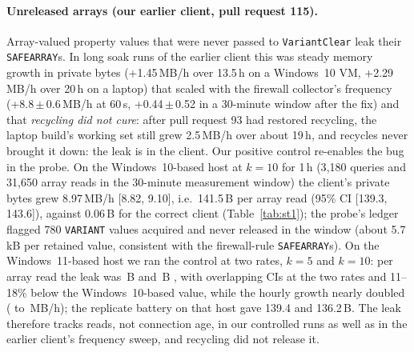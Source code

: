 \documentclass[letterpaper,twocolumn,10pt]{article}
\newcommand{\code}[1]{\texttt{\small #1}}
\begin{document}
\paragraph{Unreleased arrays (our earlier client, pull request 115).}
Array-valued property values that were never passed to \code{VariantClear} leak their \code{SAFEARRAY}s.
In long soak runs of the earlier client this was steady memory growth in private bytes (+1.45\,MB/h over 13.5\,h on a Windows~10 VM, +2.29\,MB/h over 20\,h on a laptop) that scaled with the firewall collector's frequency (+8.8\,$\pm$\,0.6\,MB/h at 60\,s, +0.44\,$\pm$\,0.52 in a 30-minute window after the fix) and that \emph{recycling did not cure}: after pull request 93 had restored recycling, the laptop build's working set still grew 2.5\,MB/h over about 19\,h, and recycles never brought it down: the leak is in the client.
Our positive control re-enables the bug in the probe.
On the Windows~10-based host at $k=10$ for 1\,h (3{,}180 queries and 31{,}650 array reads in the 30-minute measurement window) the client's private bytes grew 8.97\,MB/h [8.82, 9.10], i.e.\ 141.5\,B per array read (95\% CI [139.3, 143.6]), against 0.06\,B for the correct client (Table~\ref{tab:st1}); the probe's ledger flagged 780 \code{VARIANT} values acquired and never released in the window (about 5.7\,kB per retained value, consistent with the firewall-rule \code{SAFEARRAY}s).
On the Windows~11-based host we ran the control at two rates, $k=5$ and $k=10$: per array read the leak was \STtwoWbKfive{}\,B \STtwoWbKfiveCI{} and \STtwoWbKten{}\,B \STtwoWbKtenCI{}, with overlapping CIs at the two rates and 11--18\% below the Windows~10-based value, while the hourly growth nearly doubled (\STtwoWbRateFive{} to \STtwoWbRateTen{}\,MB/h); the replicate battery on that host gave 139.4 and 136.2\,B.
The leak therefore tracks reads, not connection age, in our controlled runs as well as in the earlier client's frequency sweep, and recycling did not release it.
\end{document}
